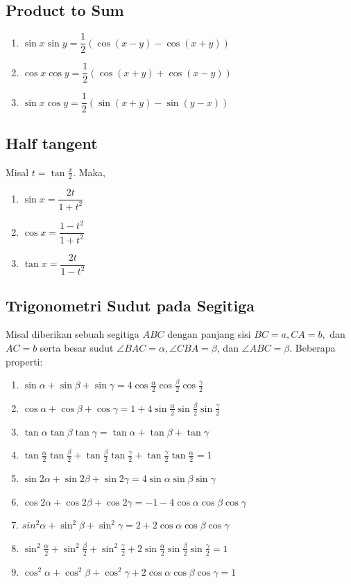 \documentclass[11pt]{scrartcl}
\begin{document}
\subsection{Product to Sum}
\begin{enumerate}
    \item $\sin{x}\sin{y} = \dfrac{1}{2}(\cos{(x - y)} - \cos{(x + y)})$
    \item $\cos{x}\cos{y} = \dfrac{1}{2}(\cos{(x + y)} + \cos{(x - y)})$
    \item $\sin{x}\cos{y} = \dfrac{1}{2}(\sin{(x + y)} - \sin{(y - x)})$
\end{enumerate}
\subsection{Half tangent}
Misal $t = \tan{\frac{x}{2}}$. Maka,
\begin{enumerate}
    \item $\sin{x} = \dfrac{2t}{1 + t^2}$
    \item $\cos{x} = \dfrac{1 - t^2}{1 + t^2}$
    \item $\tan{x} = \dfrac{2t}{1 - t^2}$
\end{enumerate}
\subsection{Trigonometri Sudut pada Segitiga}
\label{subsec:triangle_trigs}
Misal diberikan sebuah segitiga $ABC$ dengan panjang sisi $BC = a, CA = b,$ dan $AC = b$ serta besar sudut $\angle{BAC} = \alpha, \angle{CBA} = \beta$, dan $\angle{ABC} = \beta$. Beberapa properti:
\begin{enumerate}
    \item $\sin{\alpha} + \sin{\beta} + \sin{\gamma} = 4\cos{\frac{\alpha}{2}}\cos{\frac{\beta}{2}}\cos{\frac{\gamma}{2}}$
    \item $\cos{\alpha} + \cos{\beta} + \cos{\gamma} = 1 + 4\sin{\frac{\alpha}{2}}\sin{\frac{\beta}{2}}\sin{\frac{\gamma}{2}}$
    \item $\tan{\alpha}\tan{\beta}\tan{\gamma} = \tan{\alpha} + \tan{\beta} + \tan{\gamma}$
    \item $\tan{\frac{\alpha}{2}}\tan{\frac{\beta}{2}} + \tan{\frac{\beta}{2}}\tan{\frac{\gamma}{2}} + \tan{\frac{\gamma}{2}}\tan{\frac{\alpha}{2}} = 1$
    \item $\sin{2\alpha} + \sin{2\beta} + \sin{2\gamma} = 4\sin{\alpha}\sin{\beta}\sin{\gamma}$
    \item $\cos{2\alpha} + \cos{2\beta} + \cos{2\gamma} = -1 - 4\cos{\alpha}\cos{\beta}\cos{\gamma}$
    \item $sin^2{\alpha} + \sin^2{\beta} + \sin^2{\gamma} = 2 + 2\cos{\alpha}\cos{\beta}\cos{\gamma}$
    \item $\sin^2{\frac{\alpha}{2}} + \sin^2{\frac{\beta}{2}} + \sin^2{\frac{\gamma}{2}} + 2\sin{\frac{\alpha}{2}}\sin{\frac{\beta}{2}}\sin{\frac{\gamma}{2}} = 1$
    \item $\cos^2{\alpha} + \cos^2{\beta} + \cos^2{\gamma} + 2\cos{\alpha}\cos{\beta}\cos{\gamma} = 1$
\end{enumerate}
\end{document}
